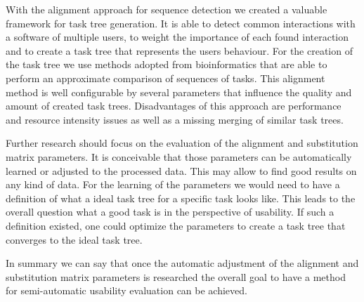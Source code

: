 With the alignment approach for sequence detection we created a valuable framework for task tree generation. 
It is able to detect common interactions with a software of multiple users, to weight the importance of each found interaction and to create a task tree that represents
the users behaviour.
For the creation of the task tree we use methods adopted from bioinformatics that are able to perform an approximate comparison of sequences of tasks. 
This alignment method is well configurable by several parameters that influence the quality and amount of created task trees.
Disadvantages of this approach are performance and resource intensity issues as well as a missing merging of similar task trees.

Further research should focus on the evaluation of the alignment and substitution matrix parameters. 
It is conceivable that those parameters can be automatically learned or adjusted to the processed data.
This may allow to find good results on any kind of data. 
For the learning of the parameters we would need to have a definition of what a ideal task tree for a specific task looks like.
This leads to the overall question what a good task is in the perspective of usability.
If such a definition existed, one could optimize the parameters to create a task tree that converges to the ideal task tree.

In summary we can say that once the automatic adjustment of the alignment and substitution matrix parameters is researched the overall goal to have a method for semi-automatic usability evaluation can be achieved.




